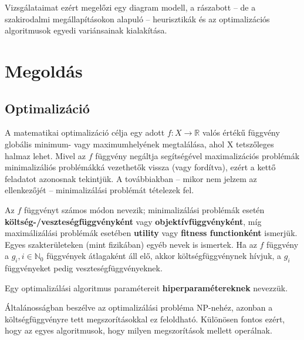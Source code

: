 Vizsgálataimat ezért megelőzi egy diagram modell, a rászabott -- de a szakirodalmi megállapításokon alapuló -- heurisztikák és az optimalizációs algoritmusok egyedi variánsainak kialakítása.


\section{Megoldás}

\subsection{Optimalizáció} \label{optimization}

A matematikai optimalizáció célja egy adott $f: X \rightarrow \mathbb{R} $ valós értékű függvény globális minimum- vagy maximumhelyének megtalálása, ahol X tetszőleges halmaz lehet. Mivel az $f$ függvény negáltja segítségével maximalizációs problémák minimalizáliós problémákká vezethetők vissza (vagy fordítva), ezért a kettő feladatot azonosnak tekintjük. A továbbiakban -- mikor nem jelzem az ellenkezőjét -- minimalizálási problémát tételezek fel.

\begin{definition}
Az $f$ függvényt számos módon nevezik; minimalizálási problémák esetén \textbf{költség-/veszteségfüggvényként} vagy \textbf{objektívfüggvényként}, míg maximálizálási problémák esetében \textbf{utility} vagy \textbf{fitness functionként} ismerjük. Egyes szakterületeken (mint fizikában) egyéb nevek is ismertek. Ha az $f$ függvény a $g_i, i \in \mathbb{N}_0$ függvények átlagaként áll elő, akkor költségfüggvénynek hívjuk, a $g_i$ függvényeket pedig veszteségfüggvényeknek.
\end{definition}

\begin{definition}
Egy optimalizálási algoritmus paramétereit \textbf{hiperparamétereknek} nevezzük.
\end{definition}

Általánosságban beszélve az optimalizálási probléma NP-nehéz, azonban a költségfüggvényre tett megszorításokkal ez feloldható. Különösen fontos ezért, hogy az egyes algoritmusok, hogy milyen megszorítások mellett operálnak.

